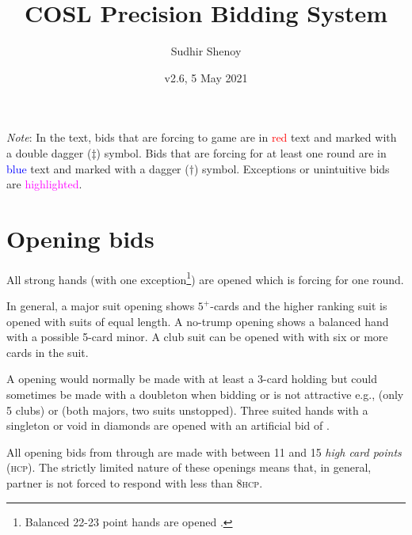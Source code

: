 \documentclass[a4paper,article,oneside]{memoir}
\newcommand{\gap}{\vspace{\baselineskip}}
\newcommand{\hcp}{\textsc{hcp}}
\newcommand{\excp}[1]{\textcolor{magenta}{#1}} %
\begin{document}
\title{COSL Precision Bidding System}
\author{Sudhir Shenoy}
\date{v2.6, 5 May 2021}
\maketitle

\tableofcontents

\gap

\emph{Note}: In the text, bids that are forcing to game are in
\textcolor{red}{red} text and marked with a double dagger ($\ddagger$)
symbol. Bids that are forcing for at least one round are in
\textcolor{blue}{blue} text and marked with a dagger ($\dagger$)
symbol. Exceptions or unintuitive bids are \excp{highlighted}.

\pagebreak

\section{Opening bids}

All strong hands (with one exception\footnote{Balanced 22-23 point
  hands are opened .}) are opened  which is forcing for
one round.

In general, a major suit opening shows $5^+$-cards and the higher
ranking suit is opened with suits of equal length. A no-trump opening
shows a balanced hand with a possible 5-card minor. A club suit can be
opened with  with six or more cards in the suit.

A  opening would normally be made with at least a 3-card holding
but could sometimes be made with a doubleton when bidding  or
 is not attractive e.g.,  (only 5 clubs)
or  (both majors, two suits unstopped). Three
suited hands with a singleton or void in diamonds are opened with an
artificial bid of .

All opening bids from  through  are made with between 11
and 15 \emph{high card points} (\hcp). The strictly limited nature of
these openings means that, in general, partner is not forced to
respond with less than 8\hcp.
\end{document}
